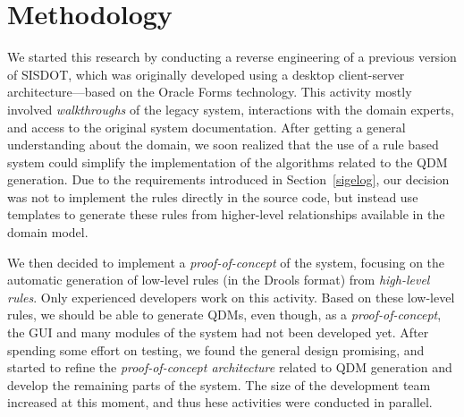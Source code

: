 \documentclass[AMA,STIX1COL]{WileyNJD-v2}
\newcommand{\callers}{\emph{high-level rules}\xspace}
\begin{document}




\section{Methodology}\label{sec:Methodology}

We started this research by conducting a
reverse engineering of a previous version of
SISDOT, which was originally developed
using a desktop client-server architecture---based on the Oracle Forms technology.
This activity
mostly involved \emph{walkthroughs} of
the legacy system, interactions with the
domain experts, and access to the original
system documentation. After getting a
general understanding about the domain, we soon
realized that the use of a rule based system
could simplify the implementation of the
algorithms related to the QDM generation. Due to the
requirements introduced in Section~\ref{sigelog}, our
decision was not to implement the rules directly
in the source code, but instead use templates
to generate these rules from higher-level
relationships available in the domain model.

We then decided to implement a
\emph{proof-of-concept} of the system,
focusing on the automatic generation of
low-level rules (in the Drools format)
from \callers. Only experienced developers
work on this activity. Based on these low-level
rules, we should be able to generate
QDMs, even though, as a \emph{proof-of-concept},
the GUI and many modules of the
system had not been developed yet. After
spending some effort on testing, we found
the general design promising, and started
to refine the \emph{proof-of-concept architecture}
related to QDM generation and
develop the remaining parts of the system. The size
of the development team increased at this moment, and
thus hese activities were conducted in parallel. 
\end{document}
